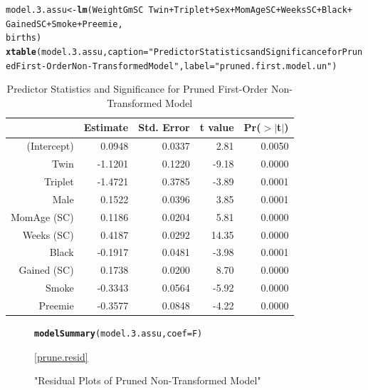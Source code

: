 \documentclass{article}\usepackage[]{graphicx}\usepackage[]{xcolor}
\makeatletter
\newcommand{\hlstr}[1]{\textcolor[rgb]{0.192,0.494,0.8}{#1}}%
\newcommand{\hlopt}[1]{\textcolor[rgb]{0,0,0}{#1}}%
\newcommand{\hlstd}[1]{\textcolor[rgb]{0.345,0.345,0.345}{#1}}%
\newcommand{\hlkwb}[1]{\textcolor[rgb]{0.69,0.353,0.396}{#1}}%
\newcommand{\hlkwc}[1]{\textcolor[rgb]{0.333,0.667,0.333}{#1}}%
\newcommand{\hlkwd}[1]{\textcolor[rgb]{0.737,0.353,0.396}{\textbf{#1}}}%
\newenvironment{kframe}{%
 \def\at@end@of@kframe{}%
 \ifinner\ifhmode%
  \def\at@end@of@kframe{\end{minipage}}%
  \begin{minipage}{\columnwidth}%
 \fi\fi%
 \def\FrameCommand##1{\hskip\@totalleftmargin \hskip-\fboxsep
 \colorbox{shadecolor}{##1}\hskip-\fboxsep
     \hskip-\linewidth \hskip-\@totalleftmargin \hskip\columnwidth}%
 \MakeFramed {\advance\hsize-\width
   \@totalleftmargin\z@ \linewidth\hsize
   \@setminipage}}%
 {\par\unskip\endMakeFramed%
 \at@end@of@kframe}
\newenvironment{knitrout}{}{} %
\makeatother
\begin{document}
\begin{knitrout}
\color{fgcolor}\begin{kframe}
\begin{alltt}
\hlstd{model.3.assu} \hlkwb{<-} \hlkwd{lm}\hlstd{(WeightGmSC} \hlopt{~} \hlstd{Twin} \hlopt{+} \hlstd{Triplet} \hlopt{+} \hlstd{Sex} \hlopt{+} \hlstd{MomAgeSC} \hlopt{+} \hlstd{WeeksSC} \hlopt{+} \hlstd{Black} \hlopt{+}
                      \hlstd{GainedSC} \hlopt{+} \hlstd{Smoke} \hlopt{+} \hlstd{Preemie,}
                    \hlstd{births)}
\hlkwd{xtable}\hlstd{(model.3.assu,} \hlkwc{caption}\hlstd{=}\hlstr{"Predictor Statistics and Significance for Pruned First-Order Non-Transformed Model"}\hlstd{,} \hlkwc{label}\hlstd{=}\hlstr{"pruned.first.model.un"}\hlstd{)}
\end{alltt}
\end{kframe}
\end{knitrout}
\begin{table}[ht]
\centering
\begin{tabular}{rrrrr}
  \hline
 & Estimate & Std. Error & t value & Pr($>$$|$t$|$) \\ 
  \hline
(Intercept) & 0.0948 & 0.0337 & 2.81 & 0.0050 \\ 
  Twin & -1.1201 & 0.1220 & -9.18 & 0.0000 \\ 
  Triplet & -1.4721 & 0.3785 & -3.89 & 0.0001 \\ 
  Male & 0.1522 & 0.0396 & 3.85 & 0.0001 \\ 
  MomAge (SC) & 0.1186 & 0.0204 & 5.81 & 0.0000 \\ 
  Weeks (SC) & 0.4187 & 0.0292 & 14.35 & 0.0000 \\ 
  Black & -0.1917 & 0.0481 & -3.98 & 0.0001 \\ 
  Gained (SC) & 0.1738 & 0.0200 & 8.70 & 0.0000 \\ 
  Smoke & -0.3343 & 0.0564 & -5.92 & 0.0000 \\ 
  Preemie & -0.3577 & 0.0848 & -4.22 & 0.0000 \\ 
   \hline
\end{tabular}
\caption{Predictor Statistics and Significance for Pruned First-Order Non-Transformed Model} 
\label{pruned.first.model.un}
\end{table}

\begin{figure}
\begin{knitrout}
\color{fgcolor}\begin{kframe}
\begin{alltt}
\hlkwd{modelSummary}\hlstd{(model.3.assu,} \hlkwc{coef}\hlstd{=F)}
\end{alltt}
\end{kframe}
\end{knitrout}
\caption{"Residual Plots of Pruned Non-Transformed Model"}
\ref{prune.resid}
\end{figure}
\end{document}
